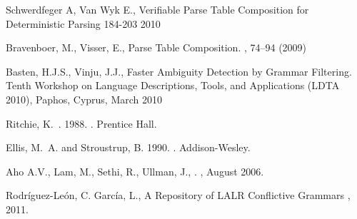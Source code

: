 {\sc Schwerdfeger A, Van Wyk E.},
\newblock Verifiable Parse Table Composition for Deterministic Parsing
    184-203  2010  

{\sc Bravenboer, M., Visser, E.},
\newblock Parse Table Composition.
, 74--94 (2009)

{\sc Basten, H.J.S., Vinju, J.J.},
\newblock Faster Ambiguity Detection by Grammar Filtering. 
\newblock Tenth Workshop on Language Descriptions, Tools, and Applications (LDTA 2010), Paphos, Cyprus, March 2010


{\sc Ritchie, K.~.} 1988.
.
\newblock Prentice Hall.

{\sc Ellis, M.~A.} {\sc and} {\sc Stroustrup, B.} 1990.
.
\newblock Addison-Wesley.
            


{\sc Aho A.V., Lam, M., Sethi, R., Ullman, J.},
.
, August 2006.

{\sc Rodr\'iguez-Le\'on, C. Garc\'ia, L.},
\newblock A Repository of LALR Conflictive Grammars 
, 2011.



